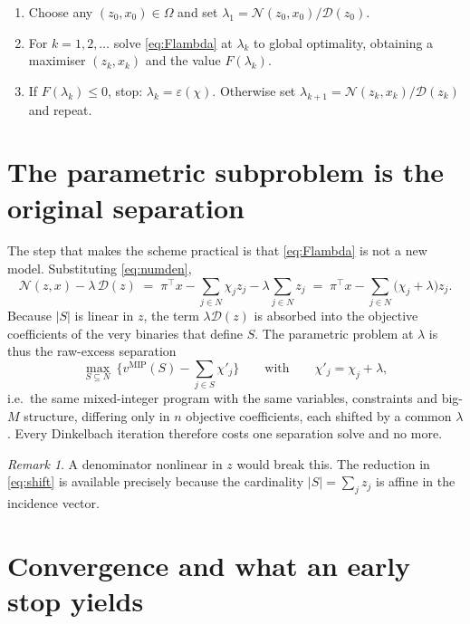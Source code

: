 \documentclass[11pt]{article}
\newcommand{\vmip}{v^{\mathrm{MIP}}}
\newcommand{\ssum}{\textstyle\sum}
\theoremstyle{remark}
\newtheorem{remark}[proposition]{Remark}
\begin{document}
\begin{enumerate}
\item Choose any $(z_0,x_0)\in\Omega$ and set
      $\lambda_1=\mathcal{N}(z_0,x_0)/\mathcal{D}(z_0)$.
\item For $k=1,2,\dots$ solve \eqref{eq:Flambda} at $\lambda_k$ to global optimality,
      obtaining a maximiser $(z_k,x_k)$ and the value $F(\lambda_k)$.
\item If $F(\lambda_k)\le 0$, stop: $\lambda_k=\varepsilon(\chi)$.
      Otherwise set $\lambda_{k+1}=\mathcal{N}(z_k,x_k)/\mathcal{D}(z_k)$ and repeat.
\end{enumerate}

\section{The parametric subproblem is the original separation}

The step that makes the scheme practical is that \eqref{eq:Flambda} is not a new model.
Substituting \eqref{eq:numden},
\begin{equation}
\mathcal{N}(z,x)-\lambda\,\mathcal{D}(z)
\;=\;\pi^{\top}x-\ssum_{j\in N}\chi_j z_j-\lambda\ssum_{j\in N}z_j
\;=\;\pi^{\top}x-\ssum_{j\in N}\big(\chi_j+\lambda\big)z_j .
\label{eq:shift}
\end{equation}
Because $|S|$ is linear in $z$, the term $\lambda\mathcal{D}(z)$ is absorbed into the
objective coefficients of the very binaries that define $S$. The parametric problem at
$\lambda$ is thus the raw-excess separation
\[
\max_{S\subseteq N}\ \Big\{\vmip(S)-\ssum_{j\in S}\chi'_j\Big\}
\qquad\text{with}\qquad \chi'_j=\chi_j+\lambda ,
\]
i.e.\ the same mixed-integer program with the same variables, constraints and big-$M$
structure, differing only in $n$ objective coefficients, each shifted by a common $\lambda$.
Every Dinkelbach iteration therefore costs one separation solve and no more.

\begin{remark}
A denominator nonlinear in $z$ would break this. The reduction in \eqref{eq:shift} is
available precisely because the cardinality $|S|=\ssum_j z_j$ is affine in the incidence
vector.
\end{remark}

\section{Convergence and what an early stop yields}\label{sec:conv}
\end{document}
